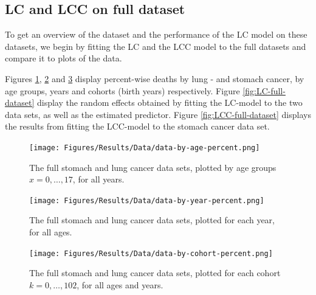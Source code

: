 \subsection{LC and LCC on full dataset}
To get an overview of the dataset and the performance of the LC model on these datasets, we begin by fitting the LC and the LCC model to the full datasets and compare it to plots of the data. 

Figures \ref{fig:data-by-age}, \ref{fig:data-by-year} and \ref{fig:data-by-cohort} display percent-wise deaths by lung - and stomach cancer, by age groups, years and cohorts (birth years) respectively. Figure \ref{fig:LC-full-dataset} display the random effects obtained by fitting the LC-model to the two data sets, as well as the estimated predictor. Figure \ref{fig:LCC-full-dataset} displays the results from fitting the LCC-model to the stomach cancer data set. 

\begin{figure}[h!]
    \centering
    \texttt{[image: Figures/Results/Data/data-by-age-percent.png]}
    \caption{The full stomach and lung cancer data sets, plotted by age groups $x = 0,\ldots,17$, for all years. }
    \label{fig:data-by-age}
\end{figure}

\begin{figure}[h!]
    \centering
    \texttt{[image: Figures/Results/Data/data-by-year-percent.png]}
    \caption{The full stomach and lung cancer data sets, plotted for each year, for all ages. }
    \label{fig:data-by-year}
\end{figure}

\begin{figure}[h!]
    \centering
    \texttt{[image: Figures/Results/Data/data-by-cohort-percent.png]}
    \caption{The full stomach and lung cancer data sets, plotted for each cohort $k = 0,\ldots,102$, for all ages and years.}
    \label{fig:data-by-cohort}
\end{figure}


